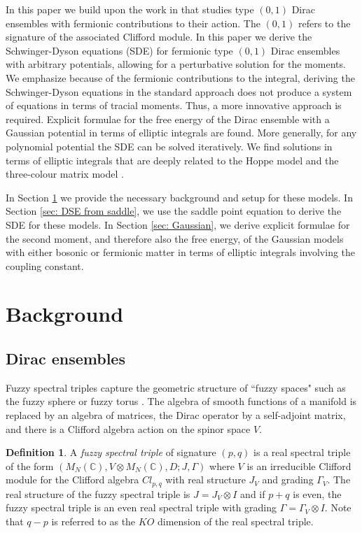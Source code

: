 \documentclass[10pt]{article}
\theoremstyle{plain}
\theoremstyle{definition}
\newtheorem{definition}{Definition}
\theoremstyle{plain}
\begin{document}
In this paper we build upon the work in \cite{khalkhali2024large} that studies type $(0,1)$ Dirac ensembles with fermionic contributions to their action. The $(0,1)$ refers to the signature of the associated Clifford module. In this paper we derive the Schwinger-Dyson equations (SDE) for fermionic type $(0,1)$ Dirac ensembles with arbitrary potentials, allowing for a perturbative solution for the moments.  We emphasize because of the fermionic contributions to the integral, deriving the Schwinger-Dyson equations in the standard approach does not produce a system of equations in terms of tracial moments. Thus, a more innovative approach is required. Explicit formulae for the free energy of the Dirac ensemble with a Gaussian potential in terms of elliptic integrals are found. More generally, for any polynomial potential  the SDE can be solved iteratively. We find solutions in terms of elliptic integrals that are deeply related to the Hoppe model \cite{hoppe1989quantum,kazakov1999d} and the three-colour matrix model \cite{di1994entropy,eynard1998iterative,kostov2002exact}.

In Section \ref{sec:background} we provide the necessary background and setup for these models. In Section \ref{sec: DSE from saddle}, we use the saddle point equation to derive the SDE for these models. In Section \ref{sec: Gaussian}, we derive explicit formulae for the second moment, and therefore also the free energy, of the Gaussian models with either bosonic or fermionic matter in terms of elliptic integrals involving the coupling constant. 






\section{Background}\label{sec:background}

\subsection{Dirac ensembles}
Fuzzy spectral triples capture the geometric structure of ``fuzzy spaces" such as the fuzzy sphere \cite{madore1992fuzzy} or fuzzy torus \cite{schreivogl2013generalized}. The algebra of smooth functions of a manifold is replaced by an algebra of matrices, the Dirac operator by a self-adjoint matrix, and there is a Clifford algebra action on the spinor space $V$.  
\begin{definition}\cite{barrett2015matrix}
A \textit{fuzzy spectral triple} of signature $(p, q)$ is a real spectral triple of the form
$(M_{N}(\mathbb{C}),V \otimes  M_{N} (\mathbb{C}) , D; J, \Gamma )$
where  $V$ is an irreducible Clifford module for the Clifford algebra $Cl_{p,q}$  with real structure $J_{V}$ and grading $\Gamma_{V}$. The real structure of the fuzzy spectral triple is $J = J_{V}\otimes I$ and if $p + q$
is even, the fuzzy spectral triple is an even real spectral triple with grading $\Gamma =  \Gamma_{V}\otimes I$. Note that $q-p$ is referred to as the $KO$ dimension of the real spectral triple.
\end{definition}
\end{document}
